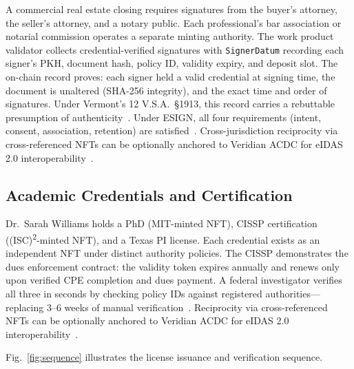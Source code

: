 \documentclass[conference,10pt]{IEEEtran}
\begin{document}
A commercial real estate closing requires signatures from the buyer's attorney, the seller's attorney, and a notary public. Each professional's bar association or notarial commission operates a separate minting authority. The work product validator collects credential-verified signatures with \texttt{SignerDatum} recording each signer's PKH, document hash, policy ID, validity expiry, and deposit slot. The on-chain record proves: each signer held a valid credential at signing time, the document is unaltered (SHA-256 integrity), and the exact time and order of signatures. Under Vermont's 12 V.S.A.~\S1913, this record carries a rebuttable presumption of authenticity~\cite{vermont2016}. Under ESIGN, all four requirements (intent, consent, association, retention) are satisfied~\cite{esign}. Cross-jurisdiction reciprocity via cross-referenced NFTs can be optionally anchored to Veridian ACDC for eIDAS 2.0 interoperability~\cite{veridian2025}.

\subsection{Academic Credentials and Certification}

Dr.~Sarah Williams holds a PhD (MIT-minted NFT), CISSP certification ((ISC)\textsuperscript{2}-minted NFT), and a Texas PI license. Each credential exists as an independent NFT under distinct authority policies. The CISSP demonstrates the dues enforcement contract: the validity token expires annually and renews only upon verified CPE completion and dues payment. A federal investigator verifies all three in seconds by checking policy IDs against registered authorities---replacing 3--6 weeks of manual verification~\cite{isc2025}. Reciprocity via cross-referenced NFTs can be optionally anchored to Veridian ACDC for eIDAS 2.0 interoperability~\cite{veridian2025}.

Fig.~\ref{fig:sequence} illustrates the license issuance and verification sequence.
\end{document}
